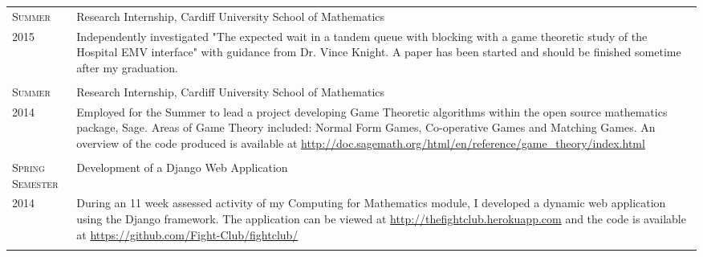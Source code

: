 \documentclass[a4paper]{article}
\begin{document}
\begin{tabularx}{\textwidth}{lX}
\\
\textsc{Summer} & Research Internship, Cardiff University School of Mathematics \\
\textsc{2015} & \footnotesize{Independently investigated "The expected wait in a tandem queue with blocking with a game theoretic study of the Hospital EMV interface" with guidance from Dr. Vince Knight. A paper has been started and should be finished sometime after my graduation.}
\\
\\
\textsc{Summer} & Research Internship, Cardiff University School of Mathematics \\
\textsc{2014} & \footnotesize{Employed for the Summer to lead a project developing Game Theoretic algorithms within the open source mathematics package, Sage.
Areas of Game Theory included: Normal Form Games, Co-operative Games and Matching Games. An overview of the code produced is available at \url{http://doc.sagemath.org/html/en/reference/game_theory/index.html}}
\\
\\
\textsc{Spring Semester} & Development of a Django Web Application\\
\textsc{2014} & \footnotesize{During an 11 week assessed activity of my Computing for Mathematics module, I developed a dynamic web application using the Django framework. The application can be viewed at \url{http://thefightclub.herokuapp.com} and the code is available at \url{https://github.com/Fight-Club/fightclub/}}
\\
\\
\end{tabularx}

\end{document}
